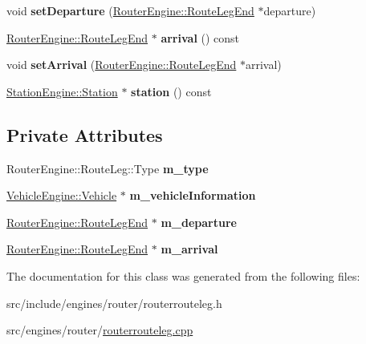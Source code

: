 \begin{DoxyCompactItemize}
void {\bfseries set\+Departure} (\mbox{\hyperlink{classRouterEngine_1_1RouteLegEnd}{Router\+Engine\+::\+Route\+Leg\+End}} $\ast$departure)
\item 
\mbox{\label{classRouterEngine_1_1RouteLeg_a82998f111cb81b20e043e45e1e8c0ebc}} 
\mbox{\hyperlink{classRouterEngine_1_1RouteLegEnd}{Router\+Engine\+::\+Route\+Leg\+End}} $\ast$ {\bfseries arrival} () const
\item 
\mbox{\label{classRouterEngine_1_1RouteLeg_aca6d3ade15e711e0bfe963b58de7a20f}} 
void {\bfseries set\+Arrival} (\mbox{\hyperlink{classRouterEngine_1_1RouteLegEnd}{Router\+Engine\+::\+Route\+Leg\+End}} $\ast$arrival)
\item 
\mbox{\label{classRouterEngine_1_1RouteLeg_a5643c5924f06246dd7e3ae9b07b70bca}} 
\mbox{\hyperlink{classStationEngine_1_1Station}{Station\+Engine\+::\+Station}} $\ast$ {\bfseries station} () const
\end{DoxyCompactItemize}
\subsection*{Private Attributes}
\begin{DoxyCompactItemize}
\item 
\mbox{\label{classRouterEngine_1_1RouteLeg_abefba3e1870352470f547966736261d0}} 
Router\+Engine\+::\+Route\+Leg\+::\+Type {\bfseries m\+\_\+type}
\item 
\mbox{\label{classRouterEngine_1_1RouteLeg_a602cdb13e3929a0378506661ed7336a7}} 
\mbox{\hyperlink{classVehicleEngine_1_1Vehicle}{Vehicle\+Engine\+::\+Vehicle}} $\ast$ {\bfseries m\+\_\+vehicle\+Information}
\item 
\mbox{\label{classRouterEngine_1_1RouteLeg_a3a3354a3f654f5c923339a30beba7339}} 
\mbox{\hyperlink{classRouterEngine_1_1RouteLegEnd}{Router\+Engine\+::\+Route\+Leg\+End}} $\ast$ {\bfseries m\+\_\+departure}
\item 
\mbox{\label{classRouterEngine_1_1RouteLeg_a85b14ef10073dec49d7fa2e20e35e54e}} 
\mbox{\hyperlink{classRouterEngine_1_1RouteLegEnd}{Router\+Engine\+::\+Route\+Leg\+End}} $\ast$ {\bfseries m\+\_\+arrival}
\end{DoxyCompactItemize}


The documentation for this class was generated from the following files\+:\begin{DoxyCompactItemize}
\item 
src/include/engines/router/routerrouteleg.\+h\item 
src/engines/router/\mbox{\hyperlink{routerrouteleg_8cpp}{routerrouteleg.\+cpp}}\end{DoxyCompactItemize}
